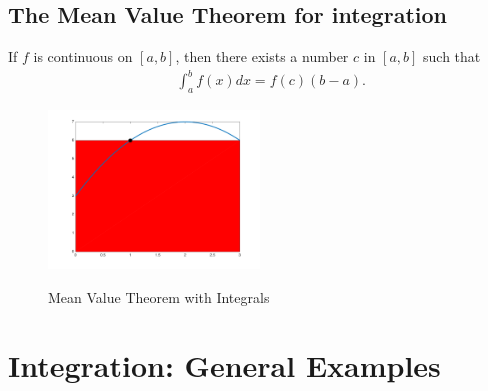 \documentclass{article}
\begin{document}

\subsection{The Mean Value Theorem for integration}

 If $f$ is continuous on
 $[a,b]$, then there exists a number $c$ in $[a,b]$ such that
\begin{eqnarray}
& &\int_a^b f(x) dx = f(c)(b- a).    \nonumber
\end{eqnarray}


\begin{figure}[!ht]
\centering
\vspace{-.2cm}
\caption{Mean Value Theorem with Integrals}
\includegraphics[width =0.5\textwidth]{AC2.pdf}%
\label{Sine_waves}%
\end{figure}
\vspace{-.5cm}

\vspace{0.5in}

\newpage

 \noindent
 \section{ Integration: General Examples}
\end{document}
